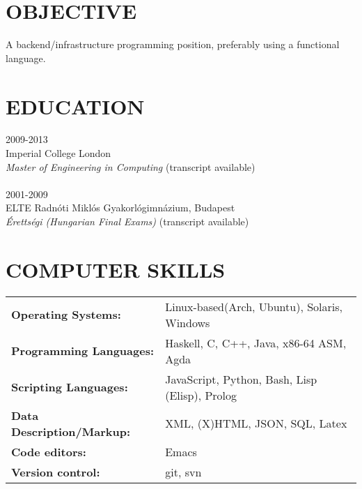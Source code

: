 \documentclass[11pt]{res} %
\begin{document}
 

\address{{\bf PRESENT ADDRESS}\\
  31 Princess Court\\
  London, United Kingdom \\
         W2 4RD}
\address{{\bf PERMANENT ADDRESS} \\ 3/D Bihari utca \\ Budapest, Hungary
         1107 \\ +361 263 3370}

                                             
\begin{resume}
                                               
 
\section{OBJECTIVE}
   A backend/infrastructure programming position, preferably using a functional language.
 
\section{EDUCATION}
2009-2013\\
Imperial College London\\
\emph{Master of Engineering in Computing} (transcript available)
\\
\\
2001-2009\\
ELTE Radnóti Miklós Gyakorlógimnázium, Budapest\\
\emph{Érettségi (Hungarian Final Exams)} (transcript available)

\section{COMPUTER SKILLS}
\begin{tabular}{ll}
\bf{Operating Systems}: & {Linux-based(Arch, Ubuntu), Solaris, Windows}\\
\bf{Programming Languages}: & {Haskell, C, C++, Java, x86-64 ASM, Agda}\\
\bf{Scripting Languages}: & {JavaScript, Python, Bash, Lisp (Elisp), Prolog}\\
\bf{Data Description/Markup}: & {XML, (X)HTML, JSON, SQL, Latex}\\
\bf{Code editors}: & {Emacs}\\
\bf{Version control}: & {git, svn}
\end{tabular}


\end{resume}
\end{document}

